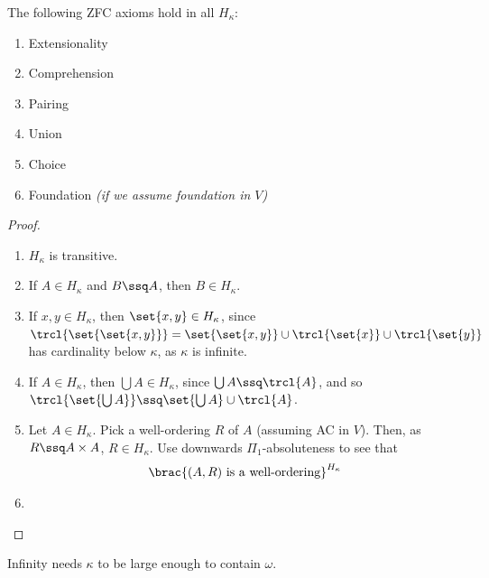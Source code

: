 \begin{boxlemma}
    The following ZFC axioms hold in all $H_{\kappa}$:
    \begin{enumerate}
        \item Extensionality
        \item Comprehension
        \item Pairing
        \item Union
        \item Choice
        \item Foundation \textit{(if we assume foundation in $V$)}
    \end{enumerate}
\end{boxlemma}
\begin{proof} \hfill
    \begin{enumerate}
        \item $H_{\kappa}$ is transitive.
        \item If $A \in H_{\kappa}$ and $B \ssq A$, then $B \in H_{\kappa}$.
        \item If $x, y \in H_{\kappa}$, then $\set{x, y} \in H_{\kappa}$, since $\trcl{\set{\set{x, y}}} = \set{\set{x, y}} \cup \trcl{\set{x}} \cup \trcl{\set{y}}$ has cardinality below $\kappa$, as $\kappa$ is infinite.
        \item If $A \in H_{\kappa}$, then $\bigcup A \in H_{\kappa}$, since $\bigcup A \ssq \trcl{A}$, and so $\trcl{\set{\bigcup A}} \ssq \set{\bigcup A} \cup \trcl{A}$.
        \item Let $A \in H_{\kappa}$. Pick a well-ordering $R$ of $A$ (assuming AC in $V$). Then, as $R \ssq A \times A$, $R \in H_{\kappa}$. Use downwards $\Pi_1$-absoluteness to see that
        \begin{align*}
            \brac{(A, R) \text{ is a well-ordering}}^{H_{\kappa}}
        \end{align*}
        \item \sorry
    \end{enumerate}
\end{proof}

Infinity needs $\kappa$ to be large enough to contain $\omega$.

